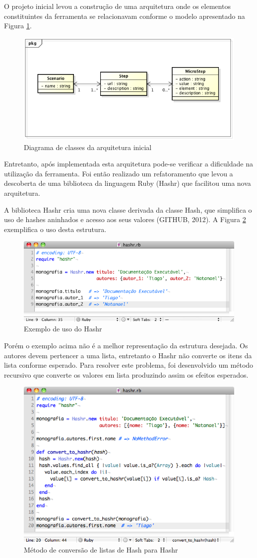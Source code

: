 O projeto inicial levou a construção de uma arquitetura onde os elementos constituintes da ferramenta se relacionavam conforme o modelo apresentado na Figura \ref{figura_36}.

\pagebreak

\begin{figure}[htpb]
    \centering
    \includegraphics[width=0.7 \textwidth]{figuras/figura_36}
    \caption{Diagrama de classes da arquitetura inicial}
    \label{figura_36}
\end{figure}

Entretanto, após implementada esta arquitetura pode-se verificar a dificuldade na utilização da ferramenta. Foi então realizado um refatoramento que levou a descoberta de uma biblioteca da linguagem Ruby (Hashr) que facilitou uma nova arquitetura.

A biblioteca Hashr cria uma nova classe derivada da classe Hash, que simplifica o uso de hashes aninhados e acesso aos seus valores (GITHUB, 2012). A Figura \ref{figura_37} exemplifica o uso desta estrutura.

\begin{figure}[htpb]
    \centering
    \includegraphics[width=0.8 \textwidth]{figuras/figura_37}
    \caption{Exemplo de uso do Hashr}
    \label{figura_37}
\end{figure}

Porém o exemplo acima não é a melhor representação da estrutura desejada. Os autores devem pertencer a uma lista, entretanto o Hashr não converte os itens da lista conforme esperado. Para resolver este problema, foi desenvolvido um método recursivo que converte os valores em lista produzindo assim os efeitos esperados.

\begin{figure}[htpb]
    \centering
    \includegraphics[width=0.7 \textwidth]{figuras/figura_38}
    \caption{Método de conversão de listas de Hash para Hashr}
    \label{figura_38}
\end{figure}
